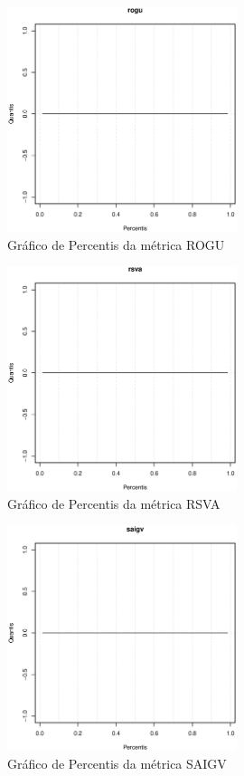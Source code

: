 \begin{apendicesenv}
\begin{figure}[h]
  \centering
  \includegraphics[width=0.6\textwidth]
      {dados/linux/rogu.eps}
  \caption{Gráfico de Percentis da métrica ROGU}
\end{figure}

\newpage

\begin{figure}[h]
  \centering
  \includegraphics[width=0.6\textwidth]
      {dados/linux/rsva.eps}
  \caption{Gráfico de Percentis da métrica RSVA}
\end{figure}

\begin{figure}[h]
  \centering
  \includegraphics[width=0.6\textwidth]
      {dados/linux/saigv.eps}
  \caption{Gráfico de Percentis da métrica SAIGV}
\end{figure}


\end{apendicesenv}
